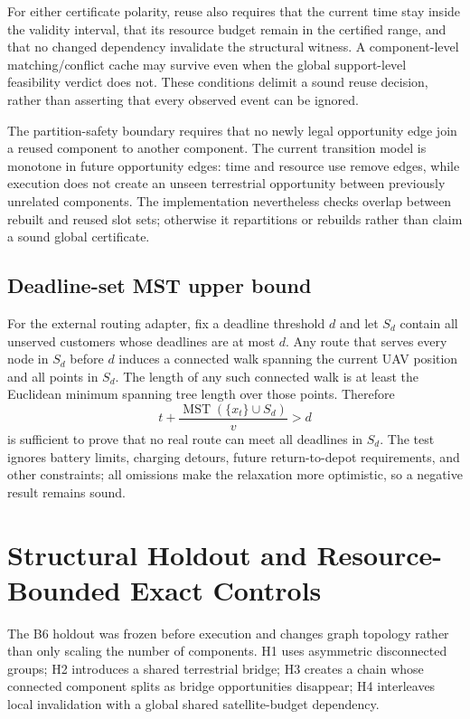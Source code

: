 For either certificate polarity, reuse also requires that the current time stay inside the validity interval, that its resource budget remain in the certified range, and that no changed dependency invalidate the structural witness. A component-level matching/conflict cache may survive even when the global support-level feasibility verdict does not. These conditions delimit a sound reuse decision, rather than asserting that every observed event can be ignored.

The partition-safety boundary requires that no newly legal opportunity edge join a reused component to another component. The current transition model is monotone in future opportunity edges: time and resource use remove edges, while execution does not create an unseen terrestrial opportunity between previously unrelated components. The implementation nevertheless checks overlap between rebuilt and reused slot sets; otherwise it repartitions or rebuilds rather than claim a sound global certificate.

\subsection{Deadline-set MST upper bound}
For the external routing adapter, fix a deadline threshold $d$ and let $S_d$ contain all unserved customers whose deadlines are at most $d$. Any route that serves every node in $S_d$ before $d$ induces a connected walk spanning the current UAV position and all points in $S_d$. The length of any such connected walk is at least the Euclidean minimum spanning tree length over those points. Therefore
\begin{equation}
t + \frac{\operatorname{MST}(\{x_t\}\cup S_d)}{v} > d
\end{equation}
is sufficient to prove that no real route can meet all deadlines in $S_d$. The test ignores battery limits, charging detours, future return-to-depot requirements, and other constraints; all omissions make the relaxation more optimistic, so a negative result remains sound.

\section{Structural Holdout and Resource-Bounded Exact Controls}
\label{app:b6}

The B6 holdout was frozen before execution and changes graph topology rather than only scaling the number of components. H1 uses asymmetric disconnected groups; H2 introduces a shared terrestrial bridge; H3 creates a chain whose connected component splits as bridge opportunities disappear; H4 interleaves local invalidation with a global shared satellite-budget dependency.


